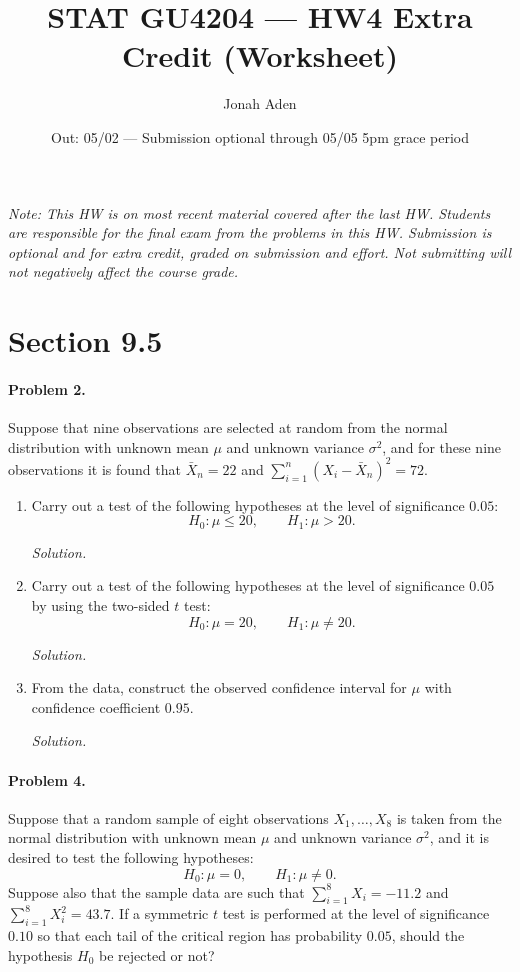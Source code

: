 \documentclass[11pt]{article}
\title{STAT GU4204 --- HW4 Extra Credit (Worksheet)}
\author{Jonah Aden}
\date{Out: 05/02 --- Submission optional through 05/05 5pm grace period}
\newcommand{\workspace}[1]{%
    \par\vspace{0.4em}\textit{Solution.}\vspace{#1}\par
}
\begin{document}
\maketitle

\noindent\textit{Note: This HW is on most recent material covered after the last HW.
Students are responsible for the final exam from the problems in this HW.
Submission is optional and for extra credit, graded on submission and effort.
Not submitting will not negatively affect the course grade.}

\bigskip

\section*{Section 9.5}

\paragraph{Problem 2.}
Suppose that nine observations are selected at random from the normal distribution
with unknown mean $\mu$ and unknown variance $\sigma^2$, and for these nine
observations it is found that $\bar{X}_n = 22$ and
$\sum_{i=1}^{n}(X_i - \bar{X}_n)^2 = 72$.
\begin{enumerate}[label=(\alph*)]
    \item Carry out a test of the following hypotheses at the level of significance $0.05$:
    \[
        H_0\colon \mu \leq 20, \qquad H_1\colon \mu > 20.
    \]
    \workspace{6cm}

    \item Carry out a test of the following hypotheses at the level of significance $0.05$
    by using the two-sided $t$ test:
    \[
        H_0\colon \mu = 20, \qquad H_1\colon \mu \neq 20.
    \]
    \workspace{6cm}

    \item From the data, construct the observed confidence interval for $\mu$ with
    confidence coefficient $0.95$.
    \workspace{4cm}
\end{enumerate}

\newpage

\paragraph{Problem 4.}
Suppose that a random sample of eight observations $X_1, \dots, X_8$ is taken from
the normal distribution with unknown mean $\mu$ and unknown variance $\sigma^2$,
and it is desired to test the following hypotheses:
\[
    H_0\colon \mu = 0, \qquad H_1\colon \mu \neq 0.
\]
Suppose also that the sample data are such that $\sum_{i=1}^{8} X_i = -11.2$ and
$\sum_{i=1}^{8} X_i^2 = 43.7$. If a symmetric $t$ test is performed at the level of
significance $0.10$ so that each tail of the critical region has probability $0.05$,
should the hypothesis $H_0$ be rejected or not?
\end{document}
